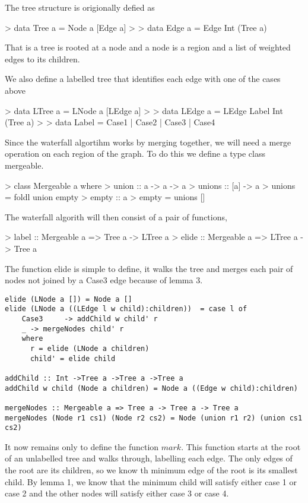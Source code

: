 \documentclass{jfp}
\begin{document}
The tree structure is origionally defied as

> data Tree a = Node a [Edge a]
>
> data  Edge a = Edge Int (Tree a)

That is a tree is rooted at a node and a node is a region and a list of weighted edges to its children.

We also define a labelled tree that identifies each edge with one of the cases above

> data LTree a = LNode a [LEdge a]
>
> data  LEdge a = LEdge Label Int (Tree a)
>
> data Label = Case1 | Case2 | Case3 | Case4

Since the waterfall algortihm works by merging together, we will need a merge operation on each region of the graph. To do this we define a type class mergeable.

> class Mergeable a where
>   union :: a -> a -> a
>   unions :: [a] -> a
>   unions = foldl union empty
>   empty :: a
>   empty = unions []


The waterfall algorith will then consist of a pair of functions,

> label :: Mergeable a => Tree a -> LTree a
> elide :: Mergeable a => LTree a -> Tree a

The function elide is simple to define, it walks the tree and merges each pair of nodes not joined by a Case3 edge because of lemma 3.

\begin{verbatim}
elide (LNode a []) = Node a []
elide (LNode a ((LEdge l w child):children))  = case l of
    Case3     -> addChild w child' r
    _ -> mergeNodes child' r
    where
      r = elide (LNode a children)
      child' = elide child

addChild :: Int ->Tree a ->Tree a ->Tree a
addChild w child (Node a children) = Node a ((Edge w child):children)

mergeNodes :: Mergeable a => Tree a -> Tree a -> Tree a
mergeNodes (Node r1 cs1) (Node r2 cs2) = Node (union r1 r2) (union cs1 cs2)

\end{verbatim}

It now remains only to define the function $mark$. This function starts at the root of an unlabelled tree and walks through, labelling each edge. The only edges of the root are its children, so we know th minimum edge of the root is its smallest child. By lemma 1, we know that the minimum child will satisfy either case 1 or case 2 and the other nodes will satisfy either case 3 or case 4.
\end{document}
